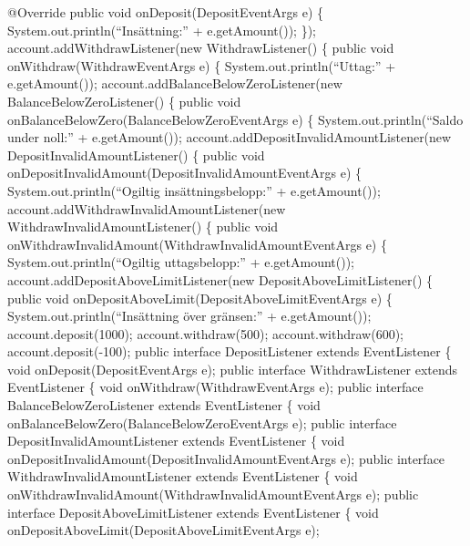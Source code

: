 {@Override} public void onDeposit(DepositEventArgs e) \{
System.out.println(``Insättning:'' + e.getAmount()); \});
account.addWithdrawListener(new WithdrawListener() \{ public void
onWithdraw(WithdrawEventArgs e) \{ System.out.println(``Uttag:'' +
e.getAmount()); account.addBalanceBelowZeroListener(new
BalanceBelowZeroListener() \{ public void
onBalanceBelowZero(BalanceBelowZeroEventArgs e) \{
System.out.println(``Saldo under noll:'' + e.getAmount());
account.addDepositInvalidAmountListener(new
DepositInvalidAmountListener() \{ public void
onDepositInvalidAmount(DepositInvalidAmountEventArgs e) \{
System.out.println(``Ogiltig insättningsbelopp:'' + e.getAmount());
account.addWithdrawInvalidAmountListener(new
WithdrawInvalidAmountListener() \{ public void
onWithdrawInvalidAmount(WithdrawInvalidAmountEventArgs e) \{
System.out.println(``Ogiltig uttagsbelopp:'' + e.getAmount());
account.addDepositAboveLimitListener(new DepositAboveLimitListener() \{
public void onDepositAboveLimit(DepositAboveLimitEventArgs e) \{
System.out.println(``Insättning över gränsen:'' + e.getAmount());
account.deposit(1000); account.withdraw(500); account.withdraw(600);
account.deposit(-100); public interface DepositListener extends
EventListener \{ void onDeposit(DepositEventArgs e); public interface
WithdrawListener extends EventListener \{ void
onWithdraw(WithdrawEventArgs e); public interface
BalanceBelowZeroListener extends EventListener \{ void
onBalanceBelowZero(BalanceBelowZeroEventArgs e); public interface
DepositInvalidAmountListener extends EventListener \{ void
onDepositInvalidAmount(DepositInvalidAmountEventArgs e); public
interface WithdrawInvalidAmountListener extends EventListener \{ void
onWithdrawInvalidAmount(WithdrawInvalidAmountEventArgs e); public
interface DepositAboveLimitListener extends EventListener \{ void
onDepositAboveLimit(DepositAboveLimitEventArgs e);

